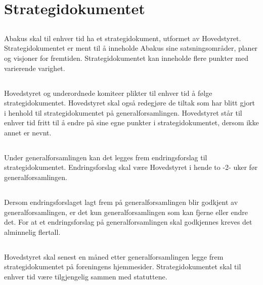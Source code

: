 \section{Strategidokumentet}
\subsection{}
Abakus skal til enhver tid ha et strategidokument, utformet av Hovedstyret.
Strategidokumentet er ment til å inneholde Abakus sine satsningsområder, planer
og visjoner for fremtiden. Strategidokumentet kan inneholde flere punkter med
varierende varighet.

\subsection{}
Hovedstyret og underordnede komiteer plikter til enhver tid å følge
strategidokumentet. Hovedstyret skal også redegjøre de tiltak som har blitt
gjort i henhold til strategidokumentet på generalforsamlingen. Hovedstyret står
til enhver tid fritt til å endre på sine egne punkter i strategidokumentet,
dersom ikke annet er nevnt.

\subsection{}
Under generalforsamlingen kan det legges frem endringsforslag til
strategidokumentet. Endringsforslag skal være Hovedstyret i hende to -2- uker
før generalforsamlingen.

\subsection{}
Dersom endringsforslaget lagt frem på generalforsamlingen blir godkjent av
generalforsamlingen, er det kun generalforsamlingen som kan fjerne eller endre
det. For at et endringsforslag på generalforsamlingen skal godkjennes kreves
det alminnelig flertall.

\subsection{}
Hovedstyret skal senest en måned etter generalforsamlingen legge frem
strategidokumentet på foreningens hjemmesider. Strategidokumentet skal til
enhver tid være tilgjengelig sammen med statuttene.
